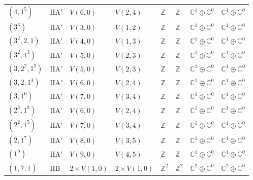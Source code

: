 \documentclass[11pt,a4paper]{article}
\begin{document}
\begin{appendix}
\begin{table}
\begin{tabular}{C{2.65cm}C{0.85cm}C{3.0cm}C{3.0cm}C{2.25cm}C{2.25cm}C{1.55cm}C{1.55cm}}
\((4, 1^{5})\) & \(\mathrm{IIA}'\) & \(V(6,0)\) & \(V(2,4)\) & \(\mathbb{Z}\) & \(\mathbb{Z}\) & \(\mathbb{C}^{1} \oplus \mathbb{C}^{0}\) & \(\mathbb{C}^{1} \oplus \mathbb{C}^{0}\) \\
\((3^{3})\) & \(\mathrm{IIA}'\) & \(V(3,0)\) & \(V(1,2)\) & \(\mathbb{Z}\) & \(\mathbb{Z}\) & \(\mathbb{C}^{1} \oplus \mathbb{C}^{0}\) & \(\mathbb{C}^{1} \oplus \mathbb{C}^{0}\) \\
\((3^{2}, 2, 1)\) & \(\mathrm{IIA}'\) & \(V(4,0)\) & \(V(1,3)\) & \(\mathbb{Z}\) & \(\mathbb{Z}\) & \(\mathbb{C}^{1} \oplus \mathbb{C}^{0}\) & \(\mathbb{C}^{1} \oplus \mathbb{C}^{0}\) \\
\((3^{2}, 1^{3})\) & \(\mathrm{IIA}'\) & \(V(5,0)\) & \(V(2,3)\) & \(\mathbb{Z}\) & \(\mathbb{Z}\) & \(\mathbb{C}^{1} \oplus \mathbb{C}^{0}\) & \(\mathbb{C}^{1} \oplus \mathbb{C}^{0}\) \\
\((3, 2^{2}, 1^{2})\) & \(\mathrm{IIA}'\) & \(V(5,0)\) & \(V(2,3)\) & \(\mathbb{Z}\) & \(\mathbb{Z}\) & \(\mathbb{C}^{1} \oplus \mathbb{C}^{0}\) & \(\mathbb{C}^{1} \oplus \mathbb{C}^{0}\) \\
\((3, 2, 1^{4})\) & \(\mathrm{IIA}'\) & \(V(6,0)\) & \(V(2,4)\) & \(\mathbb{Z}\) & \(\mathbb{Z}\) & \(\mathbb{C}^{1} \oplus \mathbb{C}^{0}\) & \(\mathbb{C}^{1} \oplus \mathbb{C}^{0}\) \\
\((3, 1^{6})\) & \(\mathrm{IIA}'\) & \(V(7,0)\) & \(V(3,4)\) & \(\mathbb{Z}\) & \(\mathbb{Z}\) & \(\mathbb{C}^{1} \oplus \mathbb{C}^{0}\) & \(\mathbb{C}^{1} \oplus \mathbb{C}^{0}\) \\
\((2^{3}, 1^{3})\) & \(\mathrm{IIA}'\) & \(V(6,0)\) & \(V(2,4)\) & \(\mathbb{Z}\) & \(\mathbb{Z}\) & \(\mathbb{C}^{1} \oplus \mathbb{C}^{0}\) & \(\mathbb{C}^{1} \oplus \mathbb{C}^{0}\) \\
\((2^{2}, 1^{5})\) & \(\mathrm{IIA}'\) & \(V(7,0)\) & \(V(3,4)\) & \(\mathbb{Z}\) & \(\mathbb{Z}\) & \(\mathbb{C}^{1} \oplus \mathbb{C}^{0}\) & \(\mathbb{C}^{1} \oplus \mathbb{C}^{0}\) \\
\((2, 1^{7})\) & \(\mathrm{IIA}'\) & \(V(8,0)\) & \(V(3,5)\) & \(\mathbb{Z}\) & \(\mathbb{Z}\) & \(\mathbb{C}^{1} \oplus \mathbb{C}^{0}\) & \(\mathbb{C}^{1} \oplus \mathbb{C}^{0}\) \\
\((1^{9})\) & \(\mathrm{IIA}'\) & \(V(9,0)\) & \(V(4,5)\) & \(\mathbb{Z}\) & \(\mathbb{Z}\) & \(\mathbb{C}^{1} \oplus \mathbb{C}^{0}\) & \(\mathbb{C}^{1} \oplus \mathbb{C}^{0}\) \\
\((1, \bar{7}, \bar{1})\) & \(\mathrm{IIB}\) & \(2 \times V(1,0)\) & \(2 \times V(1,0)\) & \(\mathbb{Z}^{2}\) & \(\mathbb{Z}^{2}\) & \(\mathbb{C}^{2} \oplus \mathbb{C}^{0}\) & \(\mathbb{C}^{2} \oplus \mathbb{C}^{0}\) \\

\end{tabular}
\end{table}
\end{appendix}
\end{document}
